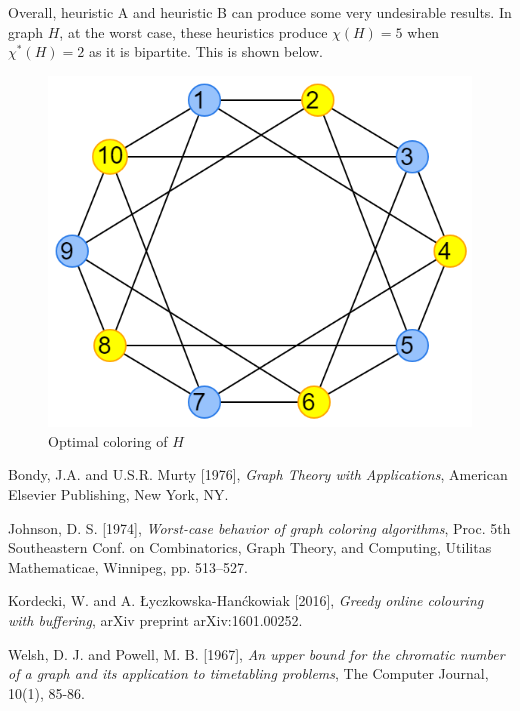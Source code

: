 \documentclass{article}
\begin{document}
Overall, heuristic A and heuristic B can produce some very undesirable results. In graph \(H\), at the worst case, these heuristics produce \(\chi(H) = 5\) when \(\chi^{*}(H) = 2\) as it is bipartite. This is shown below.

\begin{figure}[H]
\centering
\includegraphics[scale=0.38]{graph-6.png}
\caption{Optimal coloring of \(H\)}
\end{figure}

\begin{thebibliography}{9}
Bondy, J.A. and U.S.R. Murty [1976],
\emph{Graph Theory with Applications},
American Elsevier Publishing, New York, NY.

Johnson, D. S. [1974], \emph{Worst-case behavior of graph coloring algorithms}, Proc. 5th Southeastern Conf. on Combinatorics, Graph Theory, and Computing, Utilitas Mathematicae, Winnipeg, pp. 513–527.

Kordecki, W. and A. Łyczkowska-Hanćkowiak [2016], \emph{Greedy online colouring with buffering}, arXiv preprint arXiv:1601.00252.

Welsh, D. J. and Powell, M. B. [1967], \emph{An upper bound for the chromatic number of a graph and its application to timetabling problems}, The Computer Journal, 10(1), 85-86.

\end{thebibliography}
\end{document}
